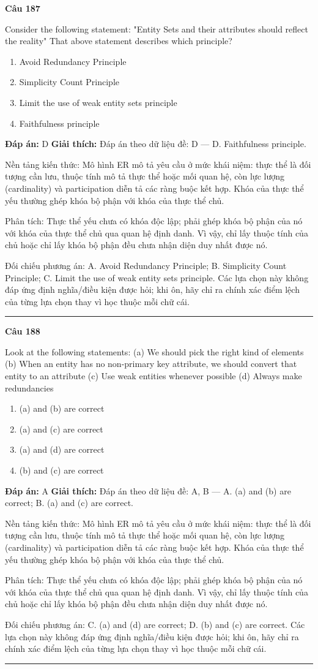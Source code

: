 \documentclass[11pt,a4paper]{article}
\newenvironment{question}[1]{%
  \par\vspace{1em}\noindent\textbf{\large Câu #1}\par\vspace{0.4em}
}{%
  \par\vspace{1em}\hrule\vspace{0.6em}
}
\newenvironment{choices}{%
  \begin{enumerate}[label=\textbf{\Alph*.},leftmargin=2.2em,itemsep=2pt,topsep=3pt]
}{%
  \end{enumerate}
}
\newcommand{\choice}{\item}
\begin{document}
\begin{question}{187}
Consider the following statement:
"Entity Sets and their attributes should reflect the reality"
That above statement describes which principle?
\begin{choices}
\choice Avoid Redundancy Principle
\choice Simplicity Count Principle
\choice Limit the use of weak entity sets principle
\choice Faithfulness principle
\end{choices}
\textbf{Đáp án:} D
\textbf{Giải thích:} Đáp án theo dữ liệu đề: D — D. Faithfulness principle.

Nền tảng kiến thức: Mô hình ER mô tả yêu cầu ở mức khái niệm: thực thể là đối tượng cần lưu, thuộc tính mô tả thực thể hoặc mối quan hệ, còn lực lượng (cardinality) và participation diễn tả các ràng buộc kết hợp. Khóa của thực thể yếu thường ghép khóa bộ phận với khóa của thực thể chủ.

Phân tích: Thực thể yếu chưa có khóa độc lập; phải ghép khóa bộ phận của nó với khóa của thực thể chủ qua quan hệ định danh. Vì vậy, chỉ lấy thuộc tính của chủ hoặc chỉ lấy khóa bộ phận đều chưa nhận diện duy nhất được nó.

Đối chiếu phương án: A. Avoid Redundancy Principle; B. Simplicity Count Principle; C. Limit the use of weak entity sets principle. Các lựa chọn này không đáp ứng định nghĩa/điều kiện được hỏi; khi ôn, hãy chỉ ra chính xác điểm lệch của từng lựa chọn thay vì học thuộc mỗi chữ cái.
\end{question}

\begin{question}{188}
Look at the following statements:
(a) We should pick the right kind of elements
(b) When an entity has no non-primary key attribute, we should convert that entity to an attribute
(c) Use weak entities whenever possible
(d) Always make redundancies
\begin{choices}
\choice (a) and (b) are correct
\choice (a) and (c) are correct
\choice (a) and (d) are correct
\choice (b) and (c) are correct
\end{choices}
\textbf{Đáp án:} A
\textbf{Giải thích:} Đáp án theo dữ liệu đề: A, B — A. (a) and (b) are correct; B. (a) and (c) are correct.

Nền tảng kiến thức: Mô hình ER mô tả yêu cầu ở mức khái niệm: thực thể là đối tượng cần lưu, thuộc tính mô tả thực thể hoặc mối quan hệ, còn lực lượng (cardinality) và participation diễn tả các ràng buộc kết hợp. Khóa của thực thể yếu thường ghép khóa bộ phận với khóa của thực thể chủ.

Phân tích: Thực thể yếu chưa có khóa độc lập; phải ghép khóa bộ phận của nó với khóa của thực thể chủ qua quan hệ định danh. Vì vậy, chỉ lấy thuộc tính của chủ hoặc chỉ lấy khóa bộ phận đều chưa nhận diện duy nhất được nó.

Đối chiếu phương án: C. (a) and (d) are correct; D. (b) and (c) are correct. Các lựa chọn này không đáp ứng định nghĩa/điều kiện được hỏi; khi ôn, hãy chỉ ra chính xác điểm lệch của từng lựa chọn thay vì học thuộc mỗi chữ cái.
\end{question}
\end{document}

